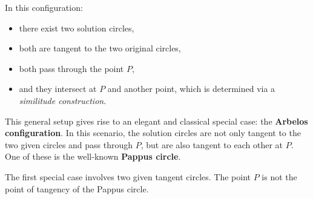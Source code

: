 \noindent
In this configuration:
\begin{itemize}
  \item there exist two solution circles,
  \item both are tangent to the two original circles,
  \item both pass through the point $P$,
  \item and they intersect at $P$ and another point, which is determined via a \emph{similitude construction}.
\end{itemize}

\medskip
\noindent
This general setup gives rise to an elegant and classical special case: the \textbf{Arbelos configuration}. In this scenario, the solution circles are not only tangent to the two given circles and pass through $P$, but are also tangent to each other at $P$. One of these is the well-known \textbf{Pappus circle}.

\vspace{1em}

\begin{minipage}{.5\textwidth}
\end{minipage}
\begin{minipage}{.5\textwidth}
\begin{tkzexample}
\end{tkzexample}
\end{minipage}

\vspace{1em}
The first special case involves two given tangent circles. The point $P$ is not the point of tangency of the Pappus circle.

